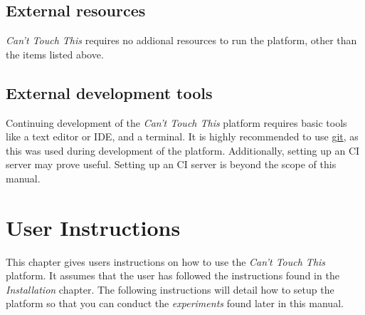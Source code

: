 \documentclass[a4paper]{article}
\begin{document}
  \subsection{External resources}
  \textit{Can't Touch This} requires no addional resources to run the platform,
  other than the items listed above.

  \subsection{External development tools}
  Continuing development of the \textit{Can't Touch This} platform requires
  basic tools like a text editor or IDE, and a terminal. It is highly
  recommended to use \href{https://git-scm.com/}{git}, as this was used during
  development of the platform. Additionally, setting up an CI server may prove
  useful. Setting up an CI server is beyond the scope of this manual.
  \clearpage


  \section{User Instructions}
  This chapter gives users instructions on how to use the \textit{Can't Touch
    This} platform. It assumes that the user has followed the instructions found
  in the \textit{Installation} chapter. The following instructions will detail
  how to setup the platform so that you can conduct the \textit{experiments}
  found later in this manual.
\end{document}
